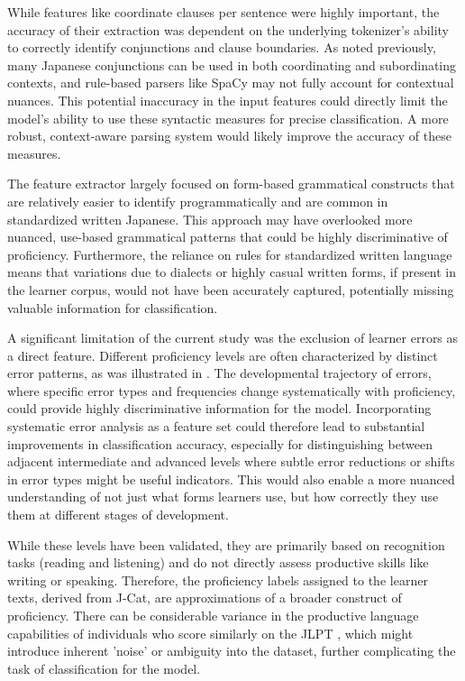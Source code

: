 While features like coordinate clauses per sentence were highly important, the accuracy of their extraction was
dependent on the underlying tokenizer's ability to correctly identify conjunctions and clause boundaries. As noted
previously, many Japanese conjunctions can be used in both coordinating and subordinating contexts, and rule-based
parsers like SpaCy may not fully account for contextual nuances. This potential inaccuracy in the input features
could directly limit the model's ability to use these syntactic measures for precise classification. A more robust,
context-aware parsing system would likely improve the accuracy of these measures.

The feature extractor largely focused on form-based grammatical constructs that are relatively easier to identify
programmatically and are common in standardized written Japanese. This approach may have overlooked more nuanced,
use-based grammatical patterns that could be highly discriminative of proficiency.
Furthermore, the
reliance on rules
for standardized written language means that variations due to dialects or highly casual written forms, if present
in the learner corpus, would not have been accurately captured, potentially missing valuable information for
classification.

A significant limitation of the current study was the exclusion of learner errors as a direct feature. Different
proficiency levels are often
characterized by distinct error patterns, as was illustrated in \citet{Hawkins_Buttery_2010}. The
developmental trajectory of errors, where specific error types and frequencies change systematically with
proficiency, could provide highly discriminative information for the model.
Incorporating
systematic error analysis as a
feature
set
could therefore lead to substantial improvements in classification accuracy, especially for distinguishing
between adjacent intermediate and advanced levels where subtle error reductions or shifts in error types
might be useful indicators. This would also enable a more nuanced understanding of not just what forms learners use,
but how correctly they use them at different stages of development.

While these levels have been validated\citet{jcat_interpretation_guide}, they
are primarily based on recognition tasks (reading and listening) and do not directly assess productive skills like
writing or speaking. Therefore, the proficiency labels assigned to the learner texts, derived from J-Cat, are
approximations of a broader construct of proficiency. There can be considerable variance in the productive language
capabilities of individuals who score similarly on the JLPT \citep{JLPTcriticism}, which might introduce inherent 'noise' or
ambiguity into the dataset, further complicating the task of classification for the model.

